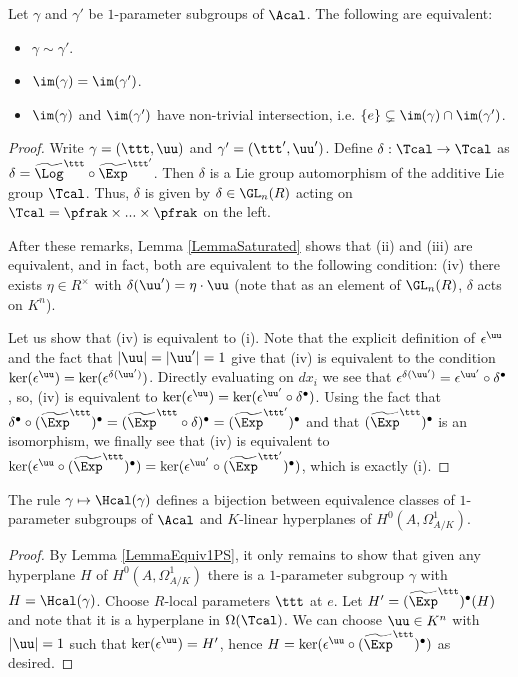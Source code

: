 \begin{lemma}
\notready \label{LemmaEquiv1PS} Let $\gamma$ and $\gamma'$ be $1$-parameter subgroups of $\Acal$. The following are equivalent:
\begin{itemize}
\item[(i)] $\gamma\sim\gamma'$.
\item[(ii)] $\im(\gamma)=\im(\gamma')$.
\item[(iii)] $\im(\gamma)$ and $\im(\gamma')$ have non-trivial intersection, i.e. $\{e\}\subsetneq \im(\gamma)\cap\im(\gamma')$.
\end{itemize}
\end{lemma}
\begin{proof}
Write $\gamma=(\ttt,\uu)$ and $\gamma'=(\ttt',\uu')$. Define $\delta:\Tcal\to \Tcal$ as $\delta=\widetilde{\Log}^\ttt\circ \widetilde{\Exp}^{\ttt'}$. Then $\delta$ is a Lie group automorphism of the additive Lie group $\Tcal$. Thus, $\delta$ is given by $\delta\in \GL_n(R)$ acting on $\Tcal=\pfrak\times...\times \pfrak$ on the left.

After these remarks, Lemma \ref{LemmaSaturated} shows that (ii) and (iii) are equivalent, and in fact, both are equivalent to the following condition: (iv) there exists $\eta\in R^\times$ with $\delta(\uu') = \eta\cdot \uu$ (note that as an element of $\GL_n(R)$, $\delta$ acts on $K^n$).

Let us show that (iv) is equivalent to (i). Note that the explicit definition of $\epsilon^{\uu}$ and the fact that $|\uu|=|\uu'|=1$ give that (iv) is equivalent to the condition $\ker(\epsilon^\uu) = \ker(\epsilon^{\delta(\uu')})$. Directly evaluating on $dx_i$ we see that $\epsilon^{\delta(\uu')}=\epsilon^{\uu'}\circ \delta^\bullet$, so, (iv) is equivalent to $\ker(\epsilon^\uu) = \ker(\epsilon^{\uu'}\circ \delta^\bullet)$. Using the fact that $\delta^\bullet\circ (\widetilde{\Exp}^{\ttt})^\bullet=(\widetilde{\Exp}^{\ttt}\circ \delta)^\bullet =( \widetilde{\Exp}^{\ttt'})^\bullet$ and that $( \widetilde{\Exp}^{\ttt})^\bullet$ is an isomorphism, we finally see that (iv) is equivalent to
$\ker(\epsilon^\uu\circ( \widetilde{\Exp}^{\ttt})^\bullet)=\ker(\epsilon^{\uu'}\circ( \widetilde{\Exp}^{\ttt'})^\bullet)$, which is exactly (i).
\end{proof}

\begin{lemma}
\notready\label{LemmaH1PS} The rule $\gamma\mapsto \Hcal(\gamma)$ defines a bijection between equivalence classes of $1$-parameter subgroups of $\Acal$ and $K$-linear hyperplanes of $H^0(A,\Omega^1_{A/K})$.
\end{lemma}
\begin{proof} By Lemma \ref{LemmaEquiv1PS}, it only remains to show that given any hyperplane $H$ of $H^0(A,\Omega^1_{A/K})$ there is a $1$-parameter subgroup $\gamma$ with $H=\Hcal(\gamma)$. Choose $R$-local parameters $\ttt$ at $e$. Let $H'=(\widetilde{\Exp}^\ttt)^\bullet(H)$ and note that it is a hyperplane in $\Omega(\Tcal)$. We can choose $\uu\in K^n$ with $|\uu|=1$ such that $\ker(\epsilon^\uu)=H'$, hence $H=\ker(\epsilon^\uu\circ (\widetilde{\Exp}^\ttt)^\bullet)$ as desired.
\end{proof}

